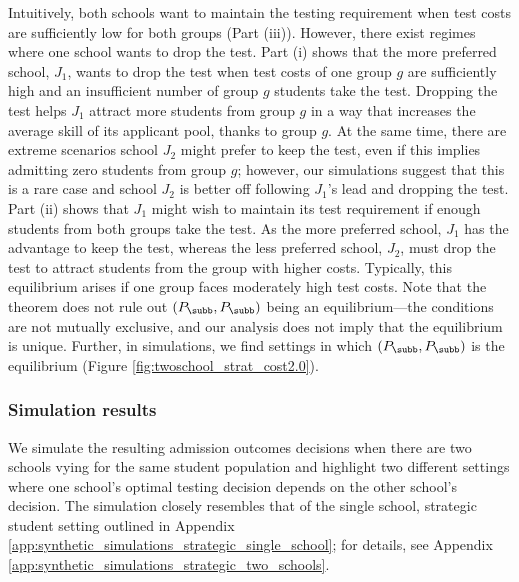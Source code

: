 {Intuitively, both schools want to maintain the testing requirement when test costs are sufficiently low for both groups (Part (iii)). However, there exist regimes where one school wants to drop the test. Part (i) shows that the more preferred school, $J_1$, wants to drop the test when test costs of one group $g$ are sufficiently high and an insufficient number of group $g$ students take the test. Dropping the test helps $J_1$ attract more students from group $g$ in a way that increases the average skill of its applicant pool, thanks to group $g$. At the same time, there are extreme scenarios school $J_2$ might prefer to keep the test, even if this implies admitting zero students from group $g$; however, our simulations suggest that this is a rare case and school $J_2$ is better off following $J_1$'s lead and dropping the test. Part (ii) shows that  $J_1$ might wish to maintain its test requirement if enough students from both groups take the test. As the more preferred school, $J_1$ has the advantage to keep the test, whereas the less preferred school, $J_2$, must drop the test to attract students from the group with higher costs. Typically, this equilibrium arises if one group faces moderately high test costs.} Note that the theorem does not rule out $(P_{\subb}, P_{\subb})$ being an equilibrium---the conditions are not mutually exclusive, and our analysis does not imply that the equilibrium is unique. Further, in simulations, we find settings in which $(P_{\subb}, P_{\subb})$ is the equilibrium (Figure \ref{fig:twoschool_strat_cost2.0}).



\subsubsection{Simulation results}
\label{ssec:simulation_strategic_schools}
We simulate the resulting admission outcomes decisions when there are two schools vying for the same student population and highlight two different settings where one school's optimal testing decision depends on the other school's decision.
The simulation closely resembles that of the single school, strategic student setting outlined in Appendix \ref{app:synthetic_simulations_strategic_single_school}; for details, see Appendix \ref{app:synthetic_simulations_strategic_two_schools}.


